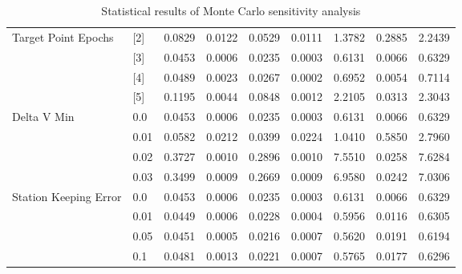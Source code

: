 \begin{table}[H]
\begin{tabular}{lllllllll}
Target Point Epochs & [2] & 0.0829 & 0.0122 & 0.0529 & 0.0111 & 1.3782 & 0.2885 & 2.2439 \\ 
 & [3] & 0.0453 & 0.0006 & 0.0235 & 0.0003 & 0.6131 & 0.0066 & 0.6329 \\ 
 & [4] & 0.0489 & 0.0023 & 0.0267 & 0.0002 & 0.6952 & 0.0054 & 0.7114 \\ 
 & [5] & 0.1195 & 0.0044 & 0.0848 & 0.0012 & 2.2105 & 0.0313 & 2.3043 \\ 
Delta V Min & 0.0 & 0.0453 & 0.0006 & 0.0235 & 0.0003 & 0.6131 & 0.0066 & 0.6329 \\ 
 & 0.01 & 0.0582 & 0.0212 & 0.0399 & 0.0224 & 1.0410 & 0.5850 & 2.7960 \\ 
 & 0.02 & 0.3727 & 0.0010 & 0.2896 & 0.0010 & 7.5510 & 0.0258 & 7.6284 \\ 
 & 0.03 & 0.3499 & 0.0009 & 0.2669 & 0.0009 & 6.9580 & 0.0242 & 7.0306 \\ 
Station Keeping Error & 0.0 & 0.0453 & 0.0006 & 0.0235 & 0.0003 & 0.6131 & 0.0066 & 0.6329 \\ 
 & 0.01 & 0.0449 & 0.0006 & 0.0228 & 0.0004 & 0.5956 & 0.0116 & 0.6305 \\ 
 & 0.05 & 0.0451 & 0.0005 & 0.0216 & 0.0007 & 0.5620 & 0.0191 & 0.6194 \\ 
 & 0.1 & 0.0481 & 0.0013 & 0.0221 & 0.0007 & 0.5765 & 0.0177 & 0.6296 \\ 
\end{tabular}
\caption{Statistical results of Monte Carlo sensitivity analysis}
\label{tab:SensitivityAnalysis}
\end{table}